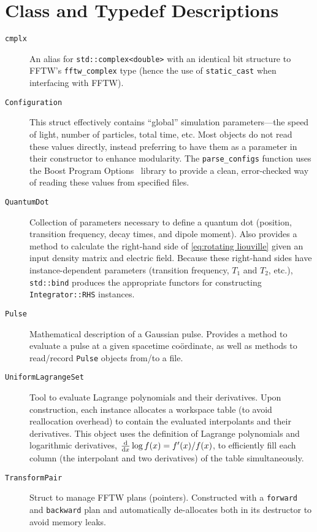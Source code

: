 \section{\label{sec:quest descriptions}Class and Typedef Descriptions}

\begin{description}
  \item[\texttt{cmplx}] An alias for \lstinline!std::complex<double>! with an identical bit structure to FFTW's \lstinline!fftw_complex! type (hence the use of \lstinline!static_cast! when interfacing with FFTW).
  \item[\texttt{Configuration}] This struct effectively contains ``global'' simulation parameters---the speed of light, number of particles, total time, etc.
    Most objects do not read these values directly, instead preferring to have them as a parameter in their constructor to enhance modularity. 
    The \lstinline!parse_configs! function uses the Boost Program Options~\cite{boost} library to provide a clean, error-checked way of reading these values from specified files.
  \item[\texttt{QuantumDot}] Collection of parameters necessary to define a quantum dot (position, transition frequency, decay times, and dipole moment).
    Also provides a method to calculate the right-hand side of \cref{eq:rotating liouville} given an input density matrix and electric field.
    Because these right-hand sides have instance-dependent parameters (transition frequency, $T_1$ and $T_2$, etc.), \lstinline!std::bind! produces the appropriate functors for constructing \lstinline!Integrator::RHS! instances.
  \item[\texttt{Pulse}] Mathematical description of a Gaussian pulse.
    Provides a method to evaluate a pulse at a given spacetime co\"ordinate, as well as methods to read/record \lstinline!Pulse! objects from/to a file.
  \item[\texttt{UniformLagrangeSet}] Tool to evaluate Lagrange polynomials and their derivatives.
    Upon construction, each instance allocates a workspace table (to avoid reallocation overhead) to contain the evaluated interpolants and their derivatives.
    This object uses the definition of Lagrange polynomials and logarithmic derivatives, $\dv{x} \log f(x) = f'(x)/f(x)$, to efficiently fill each column (the interpolant and two derivatives) of the table simultaneously.
  \item[\texttt{TransformPair}] Struct to manage FFTW plans (pointers). Constructed with a \lstinline!forward! and \lstinline!backward! plan and automatically de-allocates both in its destructor to avoid memory leaks.

\end{description}
